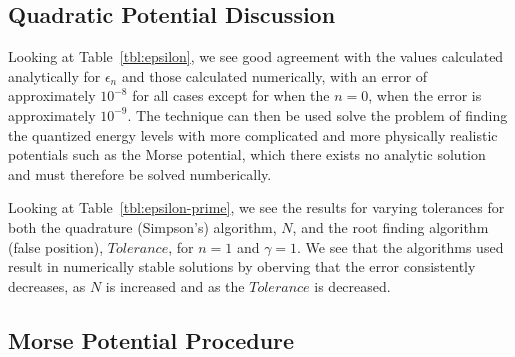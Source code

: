 \documentclass[a4paper]{IEEEtran}
\begin{document}
\subsection{Quadratic Potential Discussion}

    Looking at Table~\ref{tbl:epsilon}, we see good agreement with the values calculated
    analytically for $\epsilon_n$ and those calculated numerically, with 
    an error of approximately $10^{-8}$ for all cases except for when
    the $n = 0$, when the error is approximately $10^{-9}$. 
    The technique can then be used solve the problem of finding the
    quantized energy levels with more complicated and more physically
    realistic potentials such as the Morse potential, which there exists
    no analytic solution and must therefore be solved numberically.

    Looking at Table~\ref{tbl:epsilon-prime}, we see the results for varying tolerances for
    both the quadrature (Simpson's) algorithm, $N$, and the root finding
    algorithm (false position), $Tolerance$, for $n=1$ and $\gamma=1$.
    We see that the algorithms used result in numerically stable
    solutions by oberving that the error consistently decreases, as $N$
    is increased and as the $Tolerance$ is decreased.
    

\subsection{Morse Potential Procedure}
\end{document}
